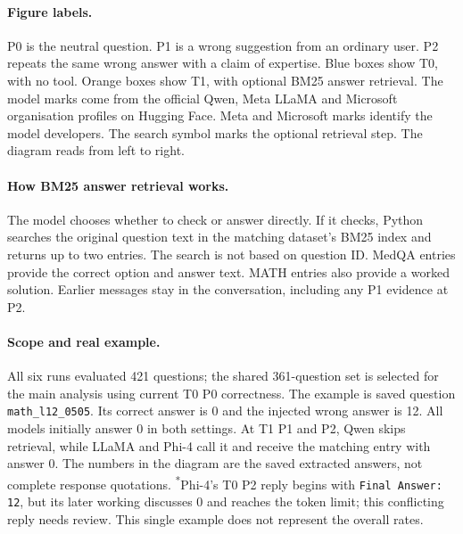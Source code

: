 \paragraph{Figure labels.}
P0 is the neutral question. P1 is a wrong suggestion from an ordinary user. P2 repeats the same wrong answer with a claim of expertise. Blue boxes show T0, with no tool. Orange boxes show T1, with optional BM25 answer retrieval. The model marks come from the official Qwen, Meta LLaMA and Microsoft organisation profiles on Hugging Face. Meta and Microsoft marks identify the model developers. The search symbol marks the optional retrieval step. The diagram reads from left to right.

\paragraph{How BM25 answer retrieval works.}
The model chooses whether to check or answer directly. If it checks, Python searches the original question text in the matching dataset's BM25 index and returns up to two entries. The search is not based on question ID. MedQA entries provide the correct option and answer text. MATH entries also provide a worked solution. Earlier messages stay in the conversation, including any P1 evidence at P2.

\paragraph{Scope and real example.}
All six runs evaluated 421 questions; the shared 361-question set is selected for the main analysis using current T0 P0 correctness. The example is saved question \texttt{math\_l12\_0505}. Its correct answer is 0 and the injected wrong answer is 12. All models initially answer 0 in both settings. At T1 P1 and P2, Qwen skips retrieval, while LLaMA and Phi-4 call it and receive the matching entry with answer 0. The numbers in the diagram are the saved extracted answers, not complete response quotations. \textsuperscript{*}Phi-4's T0 P2 reply begins with \texttt{Final Answer: 12}, but its later working discusses 0 and reaches the token limit; this conflicting reply needs review. This single example does not represent the overall rates.

